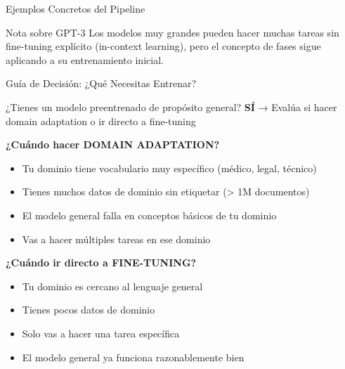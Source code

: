 \begin{frame}{Ejemplos Concretos del Pipeline}
\vspace{0.5em}

\begin{block}{Nota sobre GPT-3}
Los modelos muy grandes pueden hacer muchas tareas sin fine-tuning explícito (in-context learning), pero el concepto de fases sigue aplicando a su entrenamiento inicial.
\end{block}

\end{frame}


\begin{frame}{Guía de Decisión: ¿Qué Necesitas Entrenar?}

\begin{block}{¿Tienes un modelo preentrenado de propósito general?}
\textbf{SÍ} → Evalúa si hacer domain adaptation o ir directo a fine-tuning
\end{block}

\vspace{0.5em}

\textbf{¿Cuándo hacer DOMAIN ADAPTATION?}
\begin{itemize}
    \item Tu dominio tiene vocabulario muy específico (médico, legal, técnico)
    \item Tienes muchos datos de dominio sin etiquetar (> 1M documentos)
    \item El modelo general falla en conceptos básicos de tu dominio
    \item Vas a hacer múltiples tareas en ese dominio
\end{itemize}

\vspace{0.5em}

\textbf{¿Cuándo ir directo a FINE-TUNING?}
\begin{itemize}
    \item Tu dominio es cercano al lenguaje general
    \item Tienes pocos datos de dominio
    \item Solo vas a hacer una tarea específica
    \item El modelo general ya funciona razonablemente bien
\end{itemize}

\end{frame}




